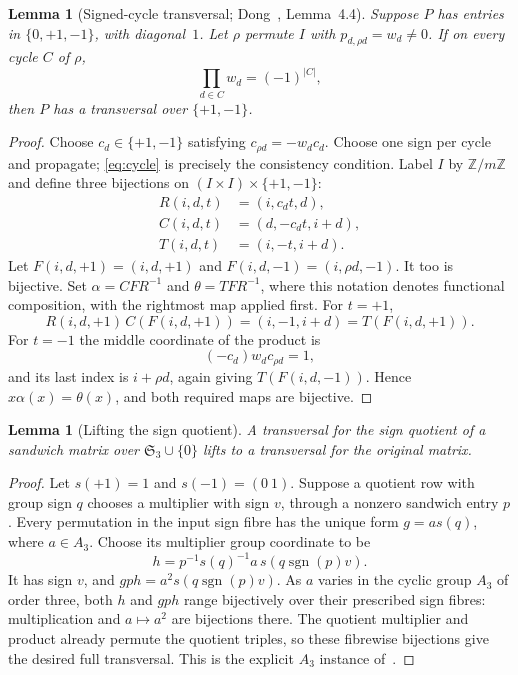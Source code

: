 \documentclass[11pt,a4paper]{article}
\newtheorem{lemma}[theorem]{Lemma}
\newcommand{\Sym}{\mathfrak S}
\newcommand{\sgn}{\operatorname{sgn}}
\newcommand{\Z}{\mathbb Z}
\begin{document}
\begin{lemma}[Signed-cycle transversal; Dong~\cite{Dong}, Lemma~4.4]\label{lem:signed}
Suppose $P$ has entries in $\{0,+1,-1\}$, with diagonal~$1$. Let $\rho$ permute $I$ with $p_{d,\rho d}=w_d\ne0$. If on every cycle $C$ of $\rho$,
\begin{equation}\label{eq:cycle}
 \prod_{d\in C}w_d=(-1)^{|C|},
\end{equation}
then $P$ has a transversal over $\{+1,-1\}$.
\end{lemma}
\begin{proof}
Choose $c_d\in\{+1,-1\}$ satisfying $c_{\rho d}=-w_dc_d$. Choose one sign per cycle and propagate; \eqref{eq:cycle} is precisely the consistency condition. Label $I$ by $\Z/m\Z$ and define three bijections on $(I\times I)\times\{+1,-1\}$:
\begin{align*}
 R(i,d,t)&=(i,c_dt,d),\\
 C(i,d,t)&=(d,-c_dt,i+d),\\
 T(i,d,t)&=(i,-t,i+d).
\end{align*}
Let $F(i,d,+1)=(i,d,+1)$ and $F(i,d,-1)=(i,\rho d,-1)$. It too is bijective. Set $\alpha=CFR^{-1}$ and $\theta=TFR^{-1}$, where this notation denotes functional composition, with the rightmost map applied first. For $t=+1$,
\[
 R(i,d,+1)\,C(F(i,d,+1))=(i,-1,i+d)=T(F(i,d,+1)).
\]
For $t=-1$ the middle coordinate of the product is
\[
 (-c_d)w_dc_{\rho d}=1,
\]
and its last index is $i+\rho d$, again giving $T(F(i,d,-1))$. Hence $x\alpha(x)=\theta(x)$, and both required maps are bijective.
\end{proof}

\begin{lemma}[Lifting the sign quotient]\label{lem:lift}
A transversal for the sign quotient of a sandwich matrix over $\Sym_3\cup\{0\}$ lifts to a transversal for the original matrix.
\end{lemma}
\begin{proof}
Let $s(+1)=1$ and $s(-1)=(0\ 1)$. Suppose a quotient row with group sign $q$ chooses a multiplier with sign $v$, through a nonzero sandwich entry $p$. Every permutation in the input sign fibre has the unique form $g=a s(q)$, where $a\in A_3$. Choose its multiplier group coordinate to be
\[
 h=p^{-1}s(q)^{-1}a\,s(q\sgn(p)v).
\]
It has sign $v$, and $gph=a^2s(q\sgn(p)v)$. As $a$ varies in the cyclic group $A_3$ of order three, both $h$ and $gph$ range bijectively over their prescribed sign fibres: multiplication and $a\mapsto a^2$ are bijections there. The quotient multiplier and product already permute the quotient triples, so these fibrewise bijections give the desired full transversal. This is the explicit $A_3$ instance of~\cite[Lemma~6.3]{ABCHK}.
\end{proof}
\end{document}
